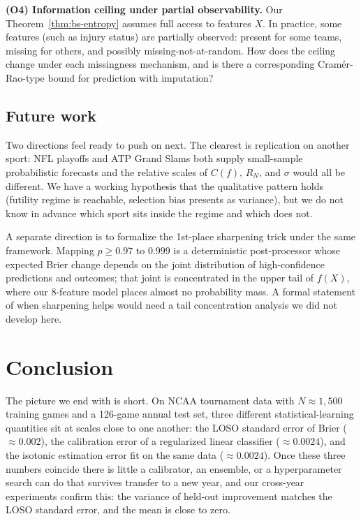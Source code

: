 \documentclass[11pt,a4paper]{article}
\theoremstyle{definition}
\begin{document}
\textbf{(O4) Information ceiling under partial observability.} Our Theorem~\ref{thm:bs-entropy} assumes full access to features $X$. In practice, some features (such as injury status) are partially observed: present for some teams, missing for others, and possibly missing-not-at-random. How does the ceiling change under each missingness mechanism, and is there a corresponding Cramér-Rao-type bound for prediction with imputation?

\subsection{Future work}

Two directions feel ready to push on next. The clearest is replication on another sport: NFL playoffs and ATP Grand Slams both supply small-sample probabilistic forecasts and the relative scales of $C(f)$, $R_N$, and $\sigma$ would all be different. We have a working hypothesis that the qualitative pattern holds (futility regime is reachable, selection bias presents as variance), but we do not know in advance which sport sits inside the regime and which does not.

A separate direction is to formalize the 1st-place sharpening trick under the same framework. Mapping $p \ge 0.97$ to $0.999$ is a deterministic post-processor whose expected Brier change depends on the joint distribution of high-confidence predictions and outcomes; that joint is concentrated in the upper tail of $f(X)$, where our 8-feature model places almost no probability mass. A formal statement of when sharpening helps would need a tail concentration analysis we did not develop here.

\section{Conclusion}

The picture we end with is short. On NCAA tournament data with $N \approx 1{,}500$ training games and a 126-game annual test set, three different statistical-learning quantities sit at scales close to one another: the LOSO standard error of Brier ($\approx 0.002$), the calibration error of a regularized linear classifier ($\approx 0.0024$), and the isotonic estimation error fit on the same data ($\approx 0.0024$). Once these three numbers coincide there is little a calibrator, an ensemble, or a hyperparameter search can do that survives transfer to a new year, and our cross-year experiments confirm this: the variance of held-out improvement matches the LOSO standard error, and the mean is close to zero.
\end{document}
